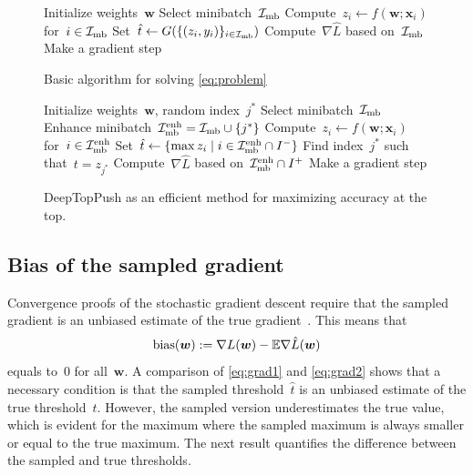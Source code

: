 \begin{figure}
  \begin{minipage}{0.48\textwidth}
    \begin{algorithm}[H]
      \centering
      \begin{algorithmic}[1]
        \State Initialize weights~$\bm{w}$
        \Repeat
        \State Select minibatch~$\mathcal{I}_{\text{mb}}$
        \State \phantom{$\Imbenh$}
        \State Compute~$z_i\gets f(\bm{w};\bm{x}_i)$ for~$i\in\mathcal{I}_{\text{mb}}$
        \State Set~$\hat t \gets G(\{(z_i,y_i)\}_{i\in\mathcal{I}_{\text{mb}}})$
        \State 
        \State Compute~$\nabla \hat L$ based on~$\mathcal{I}_{\text{mb}}$\phantom{$\Imbenh$}
        \State Make a gradient step
      \end{algorithmic}
      \caption{Basic algorithm for solving \eqref{eq:problem} \\}
      \label{alg1}
    \end{algorithm}
  \end{minipage}
  \hfill
  \begin{minipage}{0.48\textwidth}
    \begin{algorithm}[H]
      \centering
      \begin{algorithmic}[1]
        \State Initialize weights~$\bm{w}$, random index~$j^*$
        \Repeat
        \State Select minibatch~$\mathcal{I}_{\text{mb}}$
        \State Enhance minibatch~$\mathcal{I}_{\text{mb}}^{\text{enh}} = \mathcal{I}_{\text{mb}} \cup \{j^*\}$
        \State Compute~$z_i\gets f(\bm{w};\bm{x}_i)$ for~$i\in\mathcal{I}_{\text{mb}}^{\text{enh}}$
        \State Set~$\hat t \gets \{\max z_i \mid i\in \mathcal{I}_{\text{mb}}^{\text{enh}} \cap I^-\}$
        \State Find index~$j^*$ such that~$t = z_{j^*}$
        \State Compute~$\nabla \hat L$ based on~$\mathcal{I}_{\text{mb}}^{\text{enh}}\cap I^+$
        \State Make a gradient step
      \end{algorithmic}
      \caption{DeepTopPush as an efficient method for maximizing accuracy at the top.}
      \label{alg2}
    \end{algorithm}
  \end{minipage}
\end{figure}

\subsection{Bias of the sampled gradient}

Convergence proofs of the stochastic gradient descent require that the sampled gradient is an unbiased estimate of the true gradient~\cite{bottou2018optimization}. This means that
\begin{equation}\label{eq:defin_bias}
  \operatorname{bias}(\bm{w}) := \nabla L(\bm{w}) - \mathbb{E} \nabla \hat L(\bm{w})
\end{equation}
equals to~$0$ for all~$\bm{w}$. A comparison of \eqref{eq:grad1} and \eqref{eq:grad2} shows that a necessary condition is that the sampled threshold~$\hat t$ is an unbiased estimate of the true threshold~$t$. However, the sampled version underestimates the true value, which is evident for the maximum where the sampled maximum is always smaller or equal to the true maximum. The next result quantifies the difference between the sampled and true thresholds.

